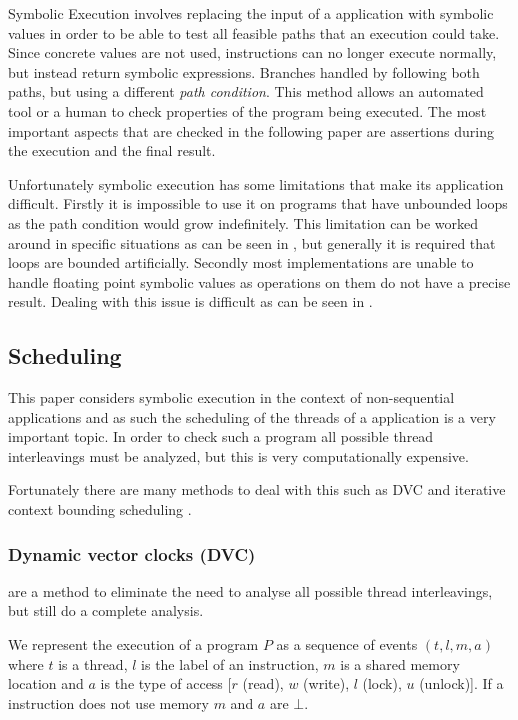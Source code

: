 \documentclass[10pt]{llncs}
\begin{document}
Symbolic Execution involves replacing the input of a application with symbolic values in order to be able to test all feasible paths that an execution could take. Since concrete values are not used, instructions can no longer execute normally, but instead return symbolic expressions. Branches handled by following both paths, but using a different \emph{path condition}. This method allows an automated tool or a human to check properties of the program being executed. The most important aspects that are checked in the following paper are assertions during the execution and the final result.

Unfortunately symbolic execution has some limitations that make its application difficult. Firstly it is impossible to use it on programs that have unbounded loops as the path condition would grow indefinitely. This limitation can be worked around in specific situations as can be seen in \cite{base5}, but generally it is required that loops are bounded artificially. Secondly most implementations are unable to handle floating point symbolic values as operations on them do not have a precise result. Dealing with this issue is difficult as can be seen in \cite{base1}.

\subsection{Scheduling}

This paper considers symbolic execution in the context of non-sequential applications and as such the scheduling of the threads of a application is a very important topic. In order to check such a program all possible thread interleavings must be analyzed, but this is very computationally expensive. 

Fortunately there are many methods to deal with this such as DVC \cite{dvc} and iterative context bounding scheduling \cite{musuvathi2007iterative}.

\subsubsection{Dynamic vector clocks (DVC)} are a method to eliminate the need to analyse all possible thread interleavings, but still do a complete analysis.

We represent the execution of a program $P$ as a sequence of events $(t, l, m, a)$ where $t$ is a thread, $l$ is the label of an instruction, $m$ is a shared memory location and $a$ is the type of access [$r$ (read), $w$ (write), $l$ (lock), $u$ (unlock)]. If a instruction does not use memory $m$ and $a$ are $\bot$.
\end{document}
